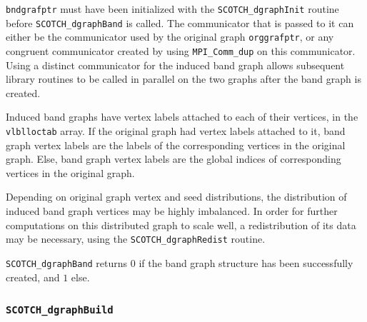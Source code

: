 \begin{itemize}
{\tt bndgrafptr} must have been initialized with the
{\tt SCOTCH\_\lbt dgraph\lbt Init} routine before
{\tt SCOTCH\_dgraph\lbt Band} is called. The communicator that is
passed to it can either be the communicator used by the original graph
{\tt org\lbt graf\lbt ptr}, or any congruent communicator created by
using {\tt MPI\_\lbt Comm\_\lbt dup} on this communicator. Using a
distinct communicator for the induced band graph allows subsequent
library routines to be called in parallel on the two graphs after the
band graph is created.

Induced band graphs have vertex labels attached to each of their
vertices, in the {\tt vlbl\lbt loc\lbt tab} array. If the original
graph had vertex labels attached to it, band graph vertex labels are
the labels of the corresponding vertices in the original graph. Else,
band graph vertex labels are the global indices of corresponding
vertices in the original graph.

Depending on original graph vertex and seed distributions, the
distribution of induced band graph vertices may be highly
imbalanced. In order for further computations on this distributed
graph to scale well, a redistribution of its data may be necessary,
using the {\tt SCOTCH\_dgraph\lbt Redist} routine.

\progret

{\tt SCOTCH\_dgraphBand} returns $0$ if the band graph structure has
been successfully created, and $1$ else.
\end{itemize}

\subsubsection{{\tt SCOTCH\_dgraphBuild}}


